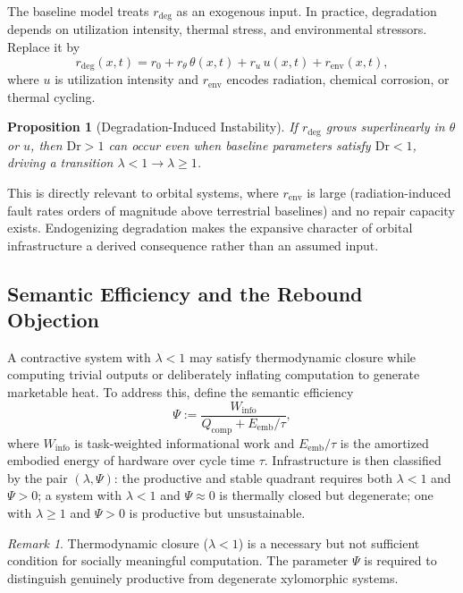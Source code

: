 \documentclass[10pt,twocolumn]{article}
\theoremstyle{plain}
\newtheorem{proposition}[theorem]{Proposition}
\theoremstyle{definition}
\theoremstyle{remark}
\newtheorem{remark}[theorem]{Remark}
\begin{document}
The baseline model treats $r_{\mathrm{deg}}$ as an exogenous input.
In practice, degradation depends on utilization intensity, thermal
stress, and environmental stressors. Replace it by
\[
  r_{\mathrm{deg}}(x,t)
  = r_0 + r_\theta\,\theta(x,t)
  + r_u\,u(x,t)
  + r_{\mathrm{env}}(x,t),
\]
where $u$ is utilization intensity and $r_{\mathrm{env}}$ encodes
radiation, chemical corrosion, or thermal cycling.

\begin{proposition}[Degradation-Induced Instability]
If $r_{\mathrm{deg}}$ grows superlinearly in $\theta$ or $u$, then
$\mathrm{Dr} > 1$ can occur even when baseline parameters satisfy
$\mathrm{Dr} < 1$, driving a transition $\lambda < 1 \to \lambda \geq 1$.
\end{proposition}

This is directly relevant to orbital systems, where $r_{\mathrm{env}}$
is large (radiation-induced fault rates orders of magnitude above
terrestrial baselines) and no repair capacity exists. Endogenizing
degradation makes the expansive character of orbital infrastructure a
derived consequence rather than an assumed input.

\subsection{Semantic Efficiency and the Rebound Objection}

A contractive system with $\lambda < 1$ may satisfy thermodynamic
closure while computing trivial outputs or deliberately inflating
computation to generate marketable heat. To address this, define the
semantic efficiency
\[
  \Psi := \frac{W_{\mathrm{info}}}{Q_{\mathrm{comp}} + E_{\mathrm{emb}}/\tau},
\]
where $W_{\mathrm{info}}$ is task-weighted informational work and
$E_{\mathrm{emb}}/\tau$ is the amortized embodied energy of hardware
over cycle time $\tau$. Infrastructure is then classified by the
pair $(\lambda, \Psi)$: the productive and stable quadrant requires
both $\lambda < 1$ and $\Psi > 0$; a system with $\lambda < 1$ and
$\Psi \approx 0$ is thermally closed but degenerate; one with
$\lambda \geq 1$ and $\Psi > 0$ is productive but unsustainable.

\begin{remark}
Thermodynamic closure ($\lambda < 1$) is a necessary but not
sufficient condition for socially meaningful computation. The
parameter $\Psi$ is required to distinguish genuinely productive
from degenerate xylomorphic systems.
\end{remark}
\end{document}
